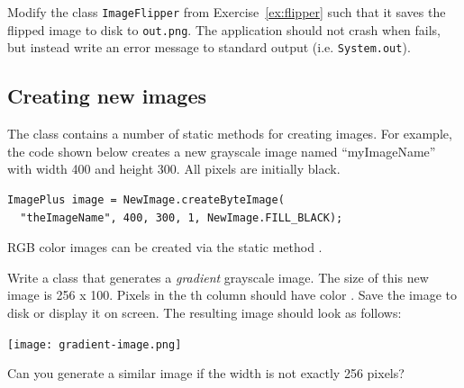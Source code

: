 \documentclass{book}
\begin{document}
\begin{exercise}\label{ex:imageflipper2}
Modify the class \texttt{ImageFlipper} from Exercise~\ref{ex:flipper} such that it saves the flipped image to disk to \texttt{out.png}. The application should not crash when  fails, but instead write an error message to standard output (i.e.  \texttt{System.out}).
\end{exercise}

\subsection{Creating new images}
The class  contains a number of static methods for creating images. For example, the code shown below creates a new grayscale image named ``myImageName'' with width 400 and height 300. All pixels are initially black.
\begin{lstlisting}
ImagePlus image = NewImage.createByteImage(
  "theImageName", 400, 300, 1, NewImage.FILL_BLACK);
\end{lstlisting}
RGB color images can be created via the static method .

\begin{exercise}\label{ex:gradient-image}
Write a class  that generates a \emph{gradient} grayscale image. The size of this new image is 256 x 100. Pixels in the th column should have color . Save the image to disk or display it on screen. The resulting image should look as follows:

\begin{center}
\texttt{[image: gradient-image.png]}
\end{center}

Can you generate a similar image if the width is not exactly 256 pixels?
\end{exercise}
\end{document}
